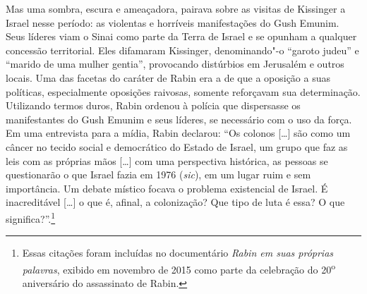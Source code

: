 Mas uma sombra, escura e ameaçadora, pairava sobre as visitas de
Kissinger a Israel nesse período: as violentas e horríveis manifestações
do Gush Emunim. Seus líderes viam o Sinai como parte da Terra de Israel
e se opunham a qualquer concessão territorial. Eles difamaram Kissinger,
denominando"-o ``garoto judeu'' e ``marido de uma mulher gentia'',
provocando distúrbios em Jerusalém e outros locais. Uma das facetas do
caráter de Rabin era a de que a oposição a suas políticas, especialmente
oposições raivosas, somente reforçavam sua determinação. Utilizando
termos duros, Rabin ordenou à polícia que dispersasse os manifestantes
do Gush Emunim e seus líderes, se necessário com o uso da força. Em uma
entrevista para a mídia, Rabin declarou: ``Os colonos {[}\ldots{}{]} são como um
câncer no tecido social e democrático do Estado de Israel, um grupo que
faz as leis com as próprias mãos {[}\ldots{}{]} com uma perspectiva histórica, as
pessoas se questionarão o que Israel fazia em 1976 (\textit{sic}), em um
lugar ruim e sem importância. Um debate místico focava o problema
existencial de Israel. É inacreditável {[}\ldots{}{]} o que é, afinal, a
colonização? Que tipo de luta é essa? O que significa?''.\footnote{Essas citações foram incluídas no documentário \textit{Rabin em suas próprias palavras},
exibido em novembro de 2015 como parte da celebração do
20\textsuperscript{o} aniversário do assassinato de Rabin.}



